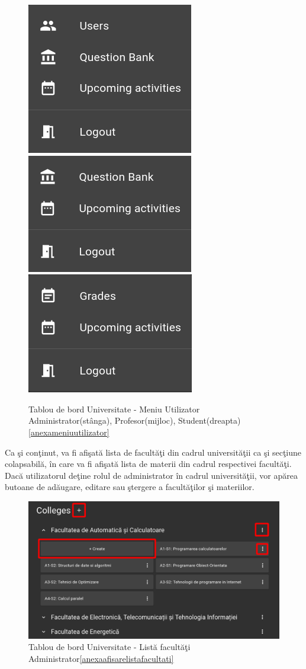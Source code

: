 \documentclass[12pt, a4paper, oneside, romanian]{teza-upb}
\begin{document}
\begin{figure}[H]
\centering
\includegraphics*[width=0.32\columnwidth]{tablou-de-bord-universitate-meniu-utilizator-administrator}
\includegraphics*[width=0.32\columnwidth]{tablou-de-bord-universitate-meniu-utilizator-profesor}
\includegraphics*[width=0.32\columnwidth]{tablou-de-bord-universitate-meniu-utilizator-student}
\caption{Tablou de bord Universitate - Meniu Utilizator Administrator(stânga), Profesor(mijloc), Student(dreapta)\ref{anexameniuutilizator}}
\label{tablou-de-bord-universitate-meniu-utilizator-administrator}
\end{figure}

Ca şi conţinut, va fi afişată lista de facultăţi din cadrul universităţii ca şi secţiune colapsabilă, în care va fi afişată lista de materii din cadrul respectivei facultăţi. Dacă utilizatorul deţine rolul de administrator în cadrul universităţii, vor apărea butoane de adăugare, editare sau ştergere a facultăţilor şi materiilor.

\begin{figure}[H]
\centering
\includegraphics*[width=\columnwidth]{tablou-de-bord-universitate-lista-facultati-administrator}
\caption{Tablou de bord Universitate - Listă facultăţi Administrator\ref{anexaafisarelistafacultati}}
\label{tablou-de-bord-universitate-lista-facultati-administrator}
\end{figure}
\end{document}
